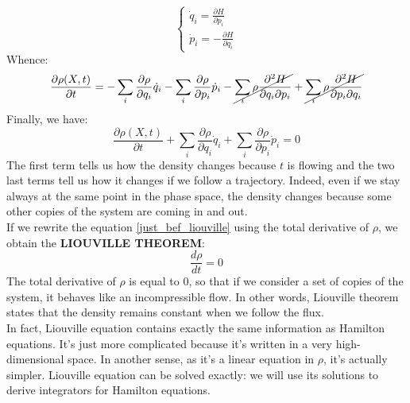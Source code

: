     \begin{equation}
        \begin{cases}
            \dot{q}_i=\frac{\partial H}{\partial p_i}\\
            \dot{p}_i=-\frac{\partial H}{\partial q_i}
        \end{cases}
    \end{equation}
    Whence:
    \begin{equation}
        \frac{\partial \rho (X,t)}{\partial t}=-\sum_i\frac{\partial \rho}{\partial q_i}\dot{q}_i-\sum_i\frac{\partial \rho}{\partial p_i}\dot{p}_i-\cancel{\sum_i\rho \frac{\partial^2 H}{\partial q_i\partial p_i}}+\cancel{\sum_i\rho \frac{\partial^2 H}{\partial p_i\partial q_i}}
    \end{equation}
    Finally, we have:
    \begin{equation}
        \frac{\partial \rho (X,t)}{\partial t}+\sum_i\frac{\partial \rho}{\partial q_i}\dot{q}_i+\sum_i\frac{\partial \rho}{\partial p_i}\dot{p}_i=0
        \label{just_bef_liouville}
    \end{equation}
    The first term tells us how the density changes because $t$ is flowing and the two last terms tell us how it changes if we follow a trajectory. Indeed, even if we stay always at the same point in the phase space, the density changes because some other copies of the system are coming in and out.
    \\If we rewrite the equation \eqref{just_bef_liouville} using the total derivative of $\rho$, we obtain the \textbf{LIOUVILLE THEOREM}:
    \begin{equation}
        \boxed{\frac{d\rho}{dt}=0}\label{liouville_theorem}
    \end{equation}
    The total derivative of $\rho$ is equal to $0$, so that if we consider a set of copies of the system, it behaves like an incompressible flow. In other words, Liouville theorem states that the density remains constant when we follow the flux.
    \\In fact, Liouville equation contains exactly the same information as Hamilton equations. It's just more complicated because it's written in a very high-dimensional space. In another sense, as it's a linear equation in $\rho$, it's actually simpler. Liouville equation can be solved exactly: we will use its solutions to derive integrators for Hamilton equations.